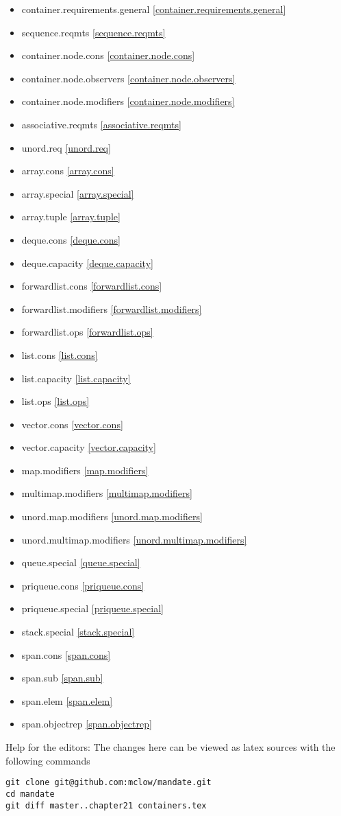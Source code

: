\begin{itemize}
\item{container.requirements.general  \ref{container.requirements.general}}
\item{sequence.reqmts      \ref{sequence.reqmts}}
\item{container.node.cons       \ref{container.node.cons}}
\item{container.node.observers   \ref{container.node.observers}}
\item{container.node.modifiers              \ref{container.node.modifiers}}
\item{associative.reqmts          \ref{associative.reqmts}}
\item{unord.req            \ref{unord.req}}

\item{array.cons               \ref{array.cons}}
\item{array.special             \ref{array.special}}
\item{array.tuple              \ref{array.tuple}}
\item{deque.cons          \ref{deque.cons}}
\item{deque.capacity            \ref{deque.capacity}}
\item{forwardlist.cons          \ref{forwardlist.cons}}
\item{forwardlist.modifiers  \ref{forwardlist.modifiers}}
\item{forwardlist.ops   \ref{forwardlist.ops}}
\item{list.cons   \ref{list.cons}}
\item{list.capacity   \ref{list.capacity}}
\item{list.ops   \ref{list.ops}}
\item{vector.cons   \ref{vector.cons}}
\item{vector.capacity   \ref{vector.capacity}}

\item{map.modifiers   \ref{map.modifiers}}
\item{multimap.modifiers   \ref{multimap.modifiers}}
\item{unord.map.modifiers  \ref{unord.map.modifiers}}
\item{unord.multimap.modifiers  \ref{unord.multimap.modifiers}}

\item{queue.special  \ref{queue.special}}
\item{priqueue.cons  \ref{priqueue.cons}}
\item{priqueue.special  \ref{priqueue.special}}
\item{stack.special  \ref{stack.special}}
\item{span.cons  \ref{span.cons}}

\item{span.sub  \ref{span.sub}}
\item{span.elem  \ref{span.elem}}
\item{span.objectrep  \ref{span.objectrep}}
\end{itemize}

\vfill
Help for the editors: The changes here can be viewed as latex sources with the following commands
\begin{verbatim}
git clone git@github.com:mclow/mandate.git
cd mandate
git diff master..chapter21 containers.tex
\end{verbatim}
\newpage
